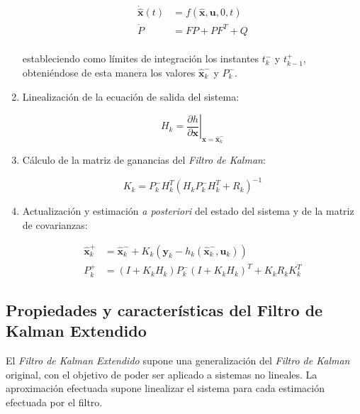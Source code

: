 \begin{enumerate}
\begin{equation}
\begin{split}
	\boldsymbol{\dot{\hat{x}}}(t) &= f(\boldsymbol{\hat{x}},\boldsymbol{u},0,t) \\
	\dot{P} &= FP + PF^T + Q
\end{split}
\end{equation} \\
\noindent
estableciendo como límites de integración los instantes $t_k^{-}$ y $t_{k-1}^{+}$, obteniéndose de esta manera los valores $\boldsymbol{\hat{x}}_k^{-}$ y $P_k^{-}$.  \par 

\item Linealización de la ecuación de salida del sistema:

\begin{equation}
	H_k = \left.\frac{\partial h}{\partial\boldsymbol{x}} \right|_{\boldsymbol{x} = \boldsymbol{\hat{x}}_k^{-}}
\end{equation}

\item Cálculo de la matriz de ganancias del \emph{Filtro de Kalman}:

\begin{equation}
	K_k = P_k^{-}H_k^T(H_kP_k^{-}H_k^T + R_k)^{-1}
\end{equation}

\item Actualización y estimación \emph{a posteriori} del estado del sistema y de la matriz de covarianzas:

\begin{equation}
\begin{split}
	\boldsymbol{\hat{x}}_k^{+} &= \boldsymbol{\hat{x}}_k^{-} + K_k(\boldsymbol{y}_k - h_k(\boldsymbol{\hat{x}}_k^{-},\boldsymbol{u}_k)) \\
	P_k^{+} &= (I + K_kH_k)P_k^{-}(I + K_kH_k)^T + K_kR_kK_k^T
\end{split}
\end{equation}

\end{enumerate}

\subsection[Propiedades y características]{Propiedades y características del Filtro de Kalman Extendido}

El \emph{Filtro de Kalman Extendido} supone una generalización del \emph{Filtro de Kalman} original, con el objetivo de poder ser aplicado a sistemas no lineales. La aproximación efectuada supone linealizar el sistema para cada estimación efectuada por el filtro. \par 

